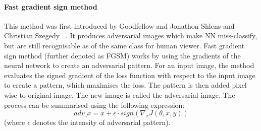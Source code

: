 \paragraph{Fast gradient sign method}
This method was first introduced by Goodfellow and Jonathon Shlens and Christian Szegedy
~\cite{goodfellow2015explaining}.
It produces adversarial images which make NN miss-classify,
but are still recognisable as of the same class for human viewer.
Fast gradient sign method (further denoted as FGSM) works
by using the gradients of the neural network to create an adversarial pattern.
For an input image,
the method evaluates the signed gradient of the loss function with respect to the input image to create a pattern,
which maximises the loss.
The pattern is then added pixel wise to original image.
The new image is called the adversarial image.
The process can be summarised using the following expression:
\begin{equation}
    adv\_x = x + \epsilon \cdot sign(\nabla_x J(\theta, x, y))
\end{equation}
(where $\epsilon$ denotes the intensity of adversarial pattern).
\\
